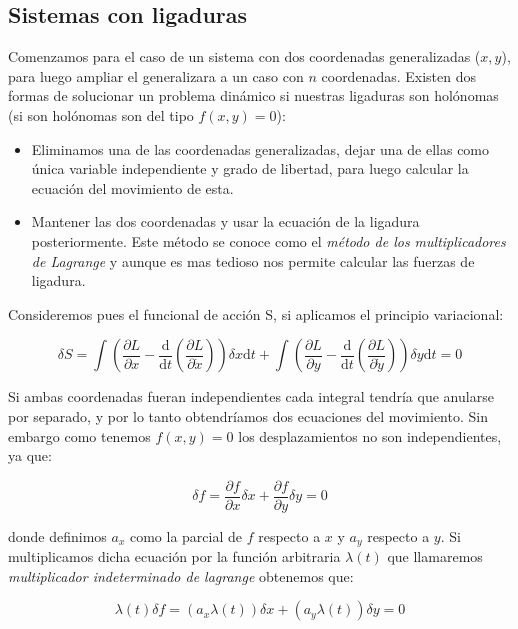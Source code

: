 \documentclass[12pt,a4paper]{book}
\newcommand{\parentesis}[1]{\left( #1  \right)}
\newcommand{\parciales}[2]{\frac{\partial #1}{\partial #2}}
\newcommand{\D}{\mathrm{d}}
\begin{document}
\subsection{Sistemas con ligaduras}

Comenzamos para el caso de un sistema con dos coordenadas generalizadas ($x,y$), para luego ampliar el generalizara a un caso con $n$ coordenadas. Existen dos formas de solucionar un problema dinámico si nuestras ligaduras son holónomas (si son holónomas son del tipo $f(x,y) = 0$):

\begin{itemize}
\item Eliminamos una de las coordenadas generalizadas, dejar una de ellas como única variable independiente y grado de libertad, para luego calcular la ecuación del movimiento de esta.

\item Mantener las dos coordenadas y usar la ecuación de la ligadura posteriormente. Este método se conoce como el \textit{método de los multiplicadores de Lagrange} y aunque es mas tedioso nos permite calcular las fuerzas de ligadura.
\end{itemize} 

Consideremos pues el funcional de acción S, si aplicamos el principio variacional:

\begin{equation}
\delta S = \int \parentesis{\parciales{L}{x} - \dfrac{\D}{\D t} \parentesis{\parciales{L}{\dot{x}}}} \delta x \D t + \int \parentesis{\parciales{L}{y} - \dfrac{\D}{\D t} \parentesis{\parciales{L}{\dot{y}}}} \delta y \D t = 0 \label{Ec:1.2.1-013}
\end{equation}

Si ambas coordenadas fueran independientes cada integral tendría que anularse por separado, y por lo tanto obtendríamos dos ecuaciones del movimiento. Sin embargo como tenemos $f(x,y)=0$ los desplazamientos no son independientes, ya que:

\begin{equation}
\delta f = \parciales{f}{x} \delta x + \parciales{f}{y} \delta y = 0
\end{equation}

donde definimos $a_x$ como la parcial de $f$ respecto a $x$ y $a_y$ respecto a $y$. Si multiplicamos dicha ecuación por la función arbitraria $\lambda (t)$ que llamaremos \textit{multiplicador indeterminado de lagrange} obtenemos que:

$$ \lambda (t) \delta f = (a_x \lambda (t)) \delta x + (a_y \lambda (t)) \delta y  = 0 $$
\end{document}
